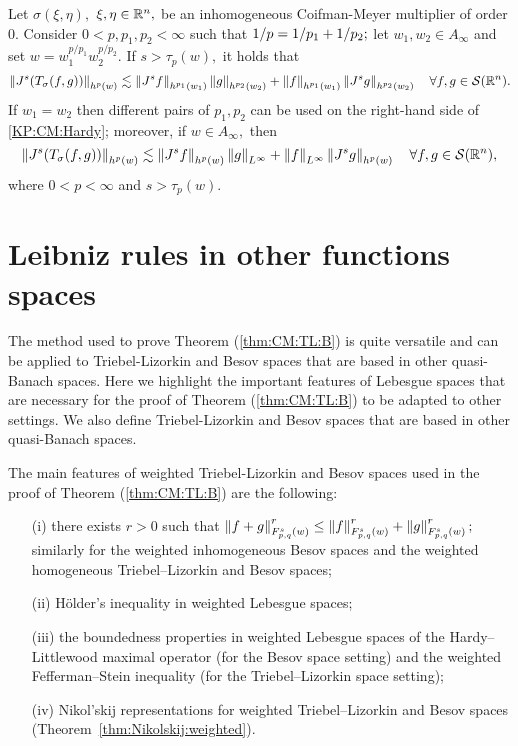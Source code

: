  
 \begin{corollary}\label{coro:KP:CM:Hardyloc}  Let $\sigma(\xi,\eta),$ $\xi,\eta\in\rn,$ be an inhomogeneous Coifman-Meyer multiplier of order $0.$ 
Consider  $0 < p, p_1, p_2  < \infty$  such that $\hcline;$ let  $w_1,w_2\in A_\infty$ and set $w=w_1^{{p}/{p_1}} w_2^{{p}/{p_2}}.$ 
If  $s > \tau_p(w),$ it holds that
\begin{equation*}
\norm{J^s(T_\sigma(f,g))}{h^p(w)} \lesssim \norm{J^s f}{h^{p_1}(w_1)} \norm{g}{h^{p_2}(w_2)} +  \norm{f}{h^{p_1}(w_1)}   \norm{J^s g}{h^{p_2}(w_2)} \quad \forall f, g \in \sw.
\end{equation*}
If $w_1=w_2$ then different pairs of $p_1, p_2$ can be used on the right-hand side of \eqref{KP:CM:Hardy}; moreover, if $w\in A_\infty,$ then 
\begin{equation*}
\norm{J^s(T_\sigma(f,g))}{h^p(w)} \lesssim \norm{J^s f}{h^{p}(w)} \norm{g}{L^\infty} +  \norm{f}{L^\infty}   \norm{J^s g}{h^{p}(w)} \quad \forall f, g \in \sw,
\end{equation*}
where $0<p<\infty$ and $s>\tau_{p}(w).$
\end{corollary}
 
 \section{Leibniz rules in other functions spaces}
 The method used to prove Theorem (\ref{thm:CM:TL:B}) is quite versatile and can be applied to Triebel-Lizorkin and Besov spaces that are based in other quasi-Banach spaces. Here we highlight the important features of Lebesgue spaces that are necessary for the proof of Theorem (\ref{thm:CM:TL:B}) to be adapted to other settings. We also define Triebel-Lizorkin and Besov spaces that are based in other quasi-Banach spaces. 
 
The main features of weighted Triebel-Lizorkin and Besov spaces used in the proof of Theorem (\ref{thm:CM:TL:B}) are the following:
\begin{enumerate}
\item[(i)]\label{item:first} there exists $r>0$ such that $\norm{f+g}{\itlw{p}{s}{q}{w}}^r\le \norm{f}{\itlw{p}{s}{q}{w}}^r+\norm{g}{\itlw{p}{s}{q}{w}}^r;$ similarly for the weighted inhomogeneous  Besov spaces and the weighted homogeneous  Triebel--Lizorkin and Besov spaces;
\item[(ii)] \label{item:second} H\"older's inequality in weighted Lebesgue spaces;
\item[(iii)] \label{item:third}  the boundedness properties in weighted Lebesgue spaces  of the Hardy--Littlewood maximal operator (for the Besov space setting) and the weighted Fefferman--Stein inequality (for the Triebel--Lizorkin space setting);
\item[(iv)] \label{item:last} Nikol'skij representations for weighted Triebel--Lizorkin and Besov spaces (Theorem~\ref{thm:Nikolskij:weighted}).
\end{enumerate}


